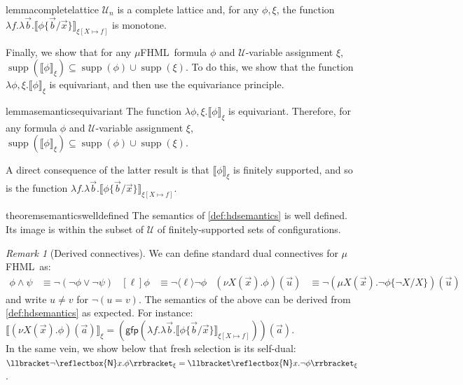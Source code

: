 \documentclass[10pt,a4paper]{article}
\theoremstyle{definition}
\theoremstyle{remark}
\newtheorem{remark}[theorem]{Remark}
\newcommand\new[0]{\reflectbox{\ensuremath{\mathsf{N}}}}
\newcommand\fresh[1]{\new #1.}
\newcommand\fhml[0]{$\mu$FHML}
\DeclareMathOperator{\supp}{supp}
\newcommand\diam[1]{\langle#1\rangle}
\newcommand\sq[1]{[#1]}
\newcommand\sem[2][\xi]{\llbracket#2\rrbracket_{#1}}
\newcommand\Ucal{\mathcal{U}}
\newcommand\gfp{\mathsf{gfp}}
\begin{document}
\begin{restatable}{lemma}{completelattice}\label{lem:completelattice}
$\Ucal_n$ is a complete lattice and,
for any $\phi, \xi$,
 the function $\lambda f.\lambda \vec b.\sem[{\xi[X\mapsto f]}]{\phi\{\vec b/\vec x\}}$ is monotone.
\end{restatable}

Finally, we show that for any \fhml\ formula $\phi$ and $\Ucal$-variable assignment $\xi$,  $\supp(\sem{\phi}) \subseteq \supp(\phi) \cup \supp(\xi)$. 
To do this, we show that the function $\lambda \phi, \xi.\sem{\phi}$ is equivariant, and then use the equivariance principle.

\begin{restatable}{lemma}{semanticsequivariant}\label{lem:semanticsequivariant}
    The function $\lambda \phi, \xi.\sem{\phi}$ is equivariant.
    Therefore, 
for any formula $\phi$ and $\Ucal$-variable assignment $\xi$, $\supp(\sem{\phi}) \subseteq \supp(\phi) \cup \supp(\xi)$.
\end{restatable}


A direct consequence of the latter result is that $\sem{\phi}$ is finitely supported, and so is the function $\lambda f.\lambda \vec b.\sem[{\xi[X \mapsto f]}]{\phi\{\vec b/\vec x\}}$.

\begin{restatable}{theorem}{semanticswelldefined}\label{thm:semanticswelldefined}
The semantics of \cref{def:hdsemantics} is well defined. Its image is within the subset of $\Ucal$ of finitely-supported sets of configurations.
\end{restatable}

\begin{remark}[Derived connectives]\label{rem:derived}
  We can define standard dual connectives for \fhml\ as:
  \begin{align*}
    \phi\land\psi &\equiv \lnot(\lnot\phi\lor\lnot\psi) &
    \sq{\ell}\phi &\equiv \lnot\diam{\ell}\lnot\phi &                        (\nu X(\vec x).\phi)(\vec u) &\equiv \lnot(\mu X(\vec x).\lnot\phi\{\lnot X/X\})(\vec u)
  \end{align*}
  and write $u\neq v$ for $\lnot(u=v)$. The semantics of the above can be derived from \cref{def:hdsemantics} as expected. For instance:\
$
  \sem{(\nu X(\vec x).\phi)(\vec a)} = (\gfp(\lambda f.\lambda\vec b. \sem[{\xi[X\mapsto f]}]{\phi\{\vec b / \vec x\}}))(\vec a)
  $.\\
  In the same vein,
  we show below that fresh selection is its self-dual:
  $\sem{\lnot\fresh{x}\phi}=\sem{\fresh{x}\lnot\phi}$.
\end{remark}
\end{document}
